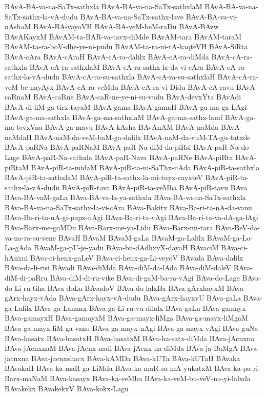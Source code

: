 {BAvA-BA-va-na-SaTx-sathxla
BAvA-BA-va-na-SaTx-sathxlaM
BAvA-BA-va-na-SaTx-sathx-la-vA-dudu
BAvA-BA-va-na-SaTx-sathx-lave
BAvA-BA-va-vi-nAshaM
BAvA-BA-vayoVH
BAvA-BA-veM-beM-raDu
BAvA-BAvw
BAvAKayxM
BAvAM-ta-BAR-va-tavx-diMde
BAvAM-tara
BAvAM-taraM
BAvAM-ta-ra-boV-dhe-ye-ni-pudu
BAvAM-ta-ra-ni-rA-kaqteVH
BAvA-SiRta
BAvA-cAra
BAvA-cAraH
BAvA-cA-ra-dalilx
BAvA-cA-ra-diMda
BAvA-cA-ra-sathxla
BAvA-cA-ra-sathxlaM
BAvA-cA-ra-sathx-la-da-vi-cAra
BAvA-cA-ra-sathx-la-vA-dudu
BAvA-cA-ra-su-sathxla
BAvA-cA-ra-su-sathxlaH
BAvA-cA-ra-veM-be-nayAyx
BAvA-cA-ra-veMdu
BAvA-cA-ra-vi-Didu
BAvA-cA-ravu
BAvA-caRnaM
BAvA-caRne
BAvA-caR-ne-ye-ni-su-vudu
BAvA-devxYta
BAvAdi
BAvA-di-liM-ga-tirx-tayaM
BAvA-gama
BAvA-gamaH
BAvA-ga-ma-ga-LAgi
BAvA-ga-ma-sathxla
BAvA-ga-ma-sathxlaM
BAvA-ga-ma-sathx-lamf
BAvA-ga-ma-tevxVna
BAvA-ga-mavu
BAvA-kAsha
BAvAnAM
BAvA-naMda
BAvA-naMdaH
BAvA-naM-da-veM-baM-ga-dalilx
BAvA-naM-da-vuM-TA-gu-tatxde
BAvA-paRNa
BAvA-paRNaM
BAvA-paR-Na-diM-da-piRsi
BAvA-paR-Na-do-Lage
BAvA-paR-Na-sathxla
BAvA-paR-Nava
BAvA-paRNe
BAvA-piRta
BAvA-piRtaM
BAvA-piR-ta-midaM
BAvA-piR-ta-ni-SaThx-nAda
BAvA-piR-ta-sathxla
BAvA-piR-ta-sathxlaM
BAvA-piR-ta-sathx-la-mi-tuyx-cayxteV
BAvA-piR-ta-sathx-la-vA-dudu
BAvA-piR-tava
BAvA-piR-ta-veMba
BAvA-piR-tavu
BAva
BAva-BA-vaM-gaLa
BAva-BA-va-la-ya-sathxla
BAva-BA-va-na-SaTx-sathxla
BAva-BA-va-na-SaTx-sathx-la-vi-cAra
BAva-Bakitx
BAva-Ba-ri-ta-nA-da-vanu
BAva-Ba-ri-ta-nA-gi-papx-nAgi
BAva-Ba-ri-ta-vAgi
BAva-Ba-ri-ta-va-dA-ga-lAgi
BAva-Barx-me-goMDu
BAva-Barx-me-ya-Lidu
BAva-Barx-mi-tara
BAva-BeV-da-va-na-ra-su-vene
BAvaH
BAvaM
BAvaM-gaLa
BAvaM-ga-Lalilx
BAvaM-ga-Lo-La-gAda
BAvaM-ga-pU-je-yadu
BAva-bu-dAdhxyX-dayaH
BAvaciM
BAva-ci-hAnxni
BAva-ci-henx-gaLeV
BAva-ci-henx-ga-Li-veyoV
BAvada
BAva-dalilx
BAva-da-li-risi
BAvadi
BAva-diMda
BAva-diM-da-lAda
BAva-diM-daleV
BAva-diM-di-paRru
BAva-diM-di-ru-vike
BAva-di-gaM-ba-ra-vAgi
BAva-do-Lage
BAva-do-Li-ru-tiha
BAva-doLu
BAvadoV
BAva-do-lalxBa
BAva-gArxhayxM
BAva-gArx-hayx-vAda
BAva-gArx-hayx-vA-dudu
BAva-gArx-hayxvU
BAva-gaLa
BAva-ga-Lalilx
BAva-ga-Lanunx
BAva-ga-Li-ru-vu-dilalx
BAva-gaLu
BAva-gamayx
BAva-gamayxH
BAva-gamayxM
BAva-ga-mayx-liMga
BAva-ga-mayx-liMgaM
BAva-ga-mayx-liM-ga-vanu
BAva-ga-mayx-nAgi
BAva-ga-mayx-vAgi
BAva-guNa
BAva-hasatx
BAva-hasatxH
BAva-hasatxM
BAva-ha-satx-diMda
BAva-jAcnxna
BAva-jAcnxnaM
BAva-jAcnx-nadi
BAva-jAcnx-na-diMda
BAva-ja-BaMgA
BAva-jacnxna
BAva-jacnxshacx
BAva-kAMDa
BAva-kUTa
BAva-kUTaH
BAvaka
BAvakaH
BAva-ka-maR-ga-LiMda
BAva-ka-maR-sa-mA-yukatxM
BAva-ka-pa-ri-Barx-maNaM
BAva-kasayx
BAva-ka-veMba
BAva-ka-veM-bu-veV-nu-yi-lalxda
BAvakekx
BAvakekxV
BAva-kokx-Lagu
}
